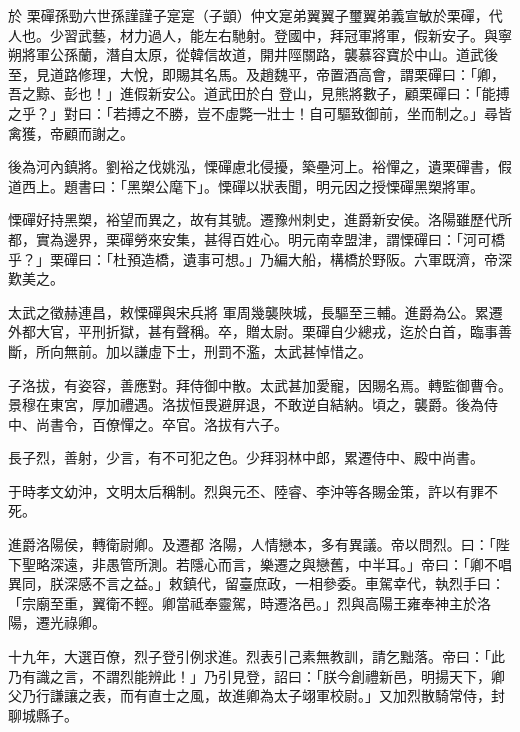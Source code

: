 
\begin{pinyinscope}

 於
 栗磾孫勁六世孫謹謹子寔寔（子顗）仲文寔弟翼翼子璽翼弟義宣敏於栗磾，代人也。少習武藝，材力過人，能左右馳射。登國中，拜冠軍將軍，假新安子。與寧朔將軍公孫蘭，潛自太原，從韓信故道，開井陘關路，襲慕容寶於中山。道武後至，見道路修理，大悅，即賜其名馬。及趙魏平，帝置酒高會，謂栗磾曰：「卿，吾之黥、彭也！」進假新安公。道武田於白
 登山，見熊將數子，顧栗磾曰：「能搏之乎？」對曰：「若搏之不勝，豈不虛斃一壯士！自可驅致御前，坐而制之。」尋皆禽獲，帝顧而謝之。



 後為河內鎮將。劉裕之伐姚泓，慄磾慮北侵擾，築壘河上。裕憚之，遺栗磾書，假道西上。題書曰：「黑槊公麾下」。慄磾以狀表聞，明元因之授慄磾黑槊將軍。



 慄磾好持黑槊，裕望而異之，故有其號。遷豫州刺史，進爵新安侯。洛陽雖歷代所都，實為邊界，栗磾勞來安集，甚得百姓心。明元南幸盟津，謂慄磾曰：「河可橋乎？」栗磾曰：「杜預造橋，遺事可想。」乃編大船，構橋於野阪。六軍既濟，帝深歎美之。



 太武之徵赫連昌，敕慄磾與宋兵將
 軍周幾襲陜城，長驅至三輔。進爵為公。累遷外都大官，平刑折獄，甚有聲稱。卒，贈太尉。栗磾自少總戎，迄於白首，臨事善斷，所向無前。加以謙虛下士，刑罰不濫，太武甚悼惜之。



 子洛拔，有姿容，善應對。拜侍御中散。太武甚加愛寵，因賜名焉。轉監御曹令。景穆在東宮，厚加禮遇。洛拔恒畏避屏退，不敢逆自結納。頃之，襲爵。後為侍中、尚書令，百僚憚之。卒官。洛拔有六子。



 長子烈，善射，少言，有不可犯之色。少拜羽林中郎，累遷侍中、殿中尚書。



 于時孝文幼沖，文明太后稱制。烈與元丕、陸睿、李沖等各賜金策，許以有罪不死。



 進爵洛陽侯，轉衛尉卿。及遷都
 洛陽，人情戀本，多有異議。帝以問烈。曰：「陛下聖略深遠，非愚管所測。若隱心而言，樂遷之與戀舊，中半耳。」帝曰：「卿不唱異同，朕深感不言之益。」敕鎮代，留臺庶政，一相參委。車駕幸代，執烈手曰：「宗廟至重，翼衛不輕。卿當祗奉靈駕，時遷洛邑。」烈與高陽王雍奉神主於洛陽，遷光祿卿。



 十九年，大選百僚，烈子登引例求進。烈表引己素無教訓，請乞黜落。帝曰：「此乃有識之言，不謂烈能辨此！」乃引見登，詔曰：「朕今創禮新邑，明揚天下，卿父乃行謙讓之表，而有直士之風，故進卿為太子翊軍校尉。」又加烈散騎常侍，封聊城縣子。




\end{pinyinscope}
